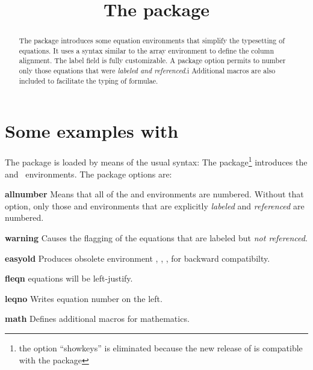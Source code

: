 \documentclass[a4paper,final,11pt]{article}
\title{The package \package{easyeqn}}
\begin{document}
\maketitle
\begin{abstract}
    The package  introduces some equation
    environments that simplify the typesetting of equations.  It uses
    a syntax similar to the array environment to define the column
    alignment.  The label field is fully customizable.  A package
    option permits to number only those equations that were
    \emph{labeled and referenced}.i Additional macros are also
    included to facilitate the typing of formulae.
\end{abstract}

\tableofcontents
\clearpage

\pagestyle{fpage}
\def\sectionmark#1{\markboth{The package \package{easyeqn}}{The package \package{easyeqn}}}
\let\chaptermark\sectionmark
\let\subsectionmark\sectionmark

\section{Some examples with }
The package is loaded by means of the usual syntax:
The package\footnote{the option ``showkeys'' is eliminated
because the new release of  is compatible with 
the  package}
introduces the  and ~environments.
The package options are:
\begin{dotlist}
\item[\textbf{allnumber}]
     Means that all of the  and 
     environments are numbered. Without that option, only
     those  and  environments that
     are explicitly \emph{labeled} and \emph{referenced} are numbered.
\item[\textbf{warning}]
     Causes the flagging of the equations that are labeled but
     \emph{not referenced}.
\item[\textbf{easyold}]
     Produces obsolete environment , ,
     ,  for backward compatibilty.
\item[\textbf{fleqn}]
     equations will be left-justify.
\item[\textbf{leqno}]
     Writes equation number on the left.
\item[\textbf{math}]
     Defines additional macros for mathematics.
\end{dotlist}
 
\end{document}
